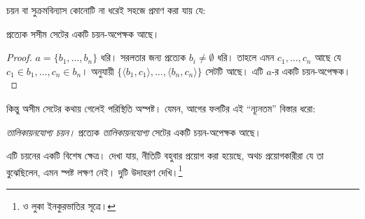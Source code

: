 \documentclass[../../../include/open-logic-section]{subfiles}
\begin{document}

চয়ন বা সুক্রমবিন্যাস কোনোটি না ধরেই সহজে প্রমাণ
করা যায় যে:

\begin{lem}[$\Zminus$-এ]
প্রত্যেক সসীম সেটের একটি চয়ন-অপেক্ষক আছে।
\end{lem}

\begin{proof}
$a = \{b_1, \ldots, b_n\}$ ধরি। সরলতার জন্য
প্রত্যেক $b_i\neq\emptyset$ ধরি। তাহলে এমন
$c_1,\ldots,c_n$ আছে যে
$c_1\in b_1,\ldots,c_n\in b_n$।
 অনুযায়ী
$\{\langle b_1,c_1\rangle,\ldots,
\langle b_n,c_n\rangle\}$ সেটটি আছে।
এটি $a$-র একটি চয়ন-অপেক্ষক।
\end{proof}

কিন্তু অসীম সেটের কথায় গেলেই পরিস্থিতি অস্পষ্ট।
যেমন, আগের ফলটির এই ``ন্যূনতম'' বিস্তার ধরো:

\begin{defish}
\emph{তালিকায়নযোগ্য চয়ন।} প্রত্যেক
\emph{তালিকায়নযোগ্য} সেটের একটি চয়ন-অপেক্ষক আছে।
\end{defish}

এটি চয়নের একটি বিশেষ ক্ষেত্র। দেখা যায়,
নীতিটি বহুবার প্রয়োগ করা হয়েছে, অথচ প্রয়োগকারীরা
যে তা বুঝেছিলেন, এমন স্পষ্ট লক্ষণ নেই। দুটি
উদাহরণ দেখি।\footnote{\citet[\S9.4]{Potter2004}
ও লুকা ইনকুরভাতির সূত্রে।}
\end{document}
